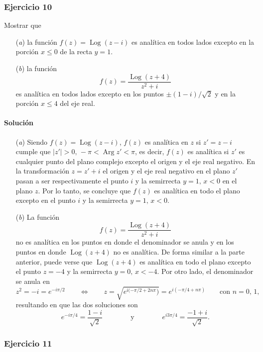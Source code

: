 \documentclass[a4paper]{report}
\DeclareMathOperator{\Arg}{Arg}
\DeclareMathOperator{\Log}{Log}
\begin{document}
\subsubsection{Ejercicio 10}

Mostrar que 
\begin{enumerate}
 \item[(\textit{a})] la función \(f(z)=\Log(z-i)\) es analítica en todos lados excepto en la porción \(x\leq0\) de la recta \(y=1\).
 \item[(\textit{b})] la función
 \[
  f(z)=\frac{\Log(z+4)}{z^2+i}
 \]
 es analítica en todos lados excepto en los puntos \(\pm(1-i)/\sqrt{2}\) y en la porción \(x\leq4\) del eje real.
\end{enumerate}

\paragraph{Solución}

\begin{enumerate}
 \item[(\textit{a})] Siendo \(f(z)=\Log(z-i)\), \(f(z)\) es analítica en \(z\) si \(z'=z-i\) cumple que \(|z'|>0,\,-\pi<\Arg z'<\pi\), es decir, \(f(z)\) es analítica si \(z'\) es cualquier punto del plano complejo excepto el origen y el eje real negativo. En la transformación \(z=z'+i\) el origen y el eje real negativo en el plano \(z'\) pasan a ser respectivamente el punto \(i\) y la semirrecta \(y=1,\,x<0\) en el plano \(z\). Por lo tanto, se concluye que \(f(z)\) es analítica en todo el plano excepto en el punto \(i\) y la semirrecta \(y=1,\,x<0\).
 \item[(\textit{b})] La función
 \[
  f(z)=\frac{\Log(z+4)}{z^2+i}
 \]
 no es analítica en los puntos en donde el denominador se anula y en los puntos en donde \(\Log(z+4)\) no es analítica. De forma similar a la parte anterior, puede verse que \(\Log(z+4)\) es analítica en todo el plano excepto el punto \(z=-4\) y la semirrecta \(y=0,\,x<-4\). Por otro lado, el denominador se anula en 
 \[
  z^2=-i=e^{-i\pi/2}
  \qquad\Leftrightarrow\qquad
  z=\sqrt{e^{i(-\pi/2+2n\pi})}=e^{i(-\pi/4+n\pi)}
  \qquad\textrm{con }n=0,\,1,
 \]
 resultando en que las dos soluciones son
 \[
  e^{-i\pi/4}=\frac{1-i}{\sqrt{2}}
  \qquad\qquad\textrm{y}\qquad\qquad
  e^{i3\pi/4}=\frac{-1+i}{\sqrt{2}}.
 \]
\end{enumerate}

\subsubsection{Ejercicio 11}
\end{document}
